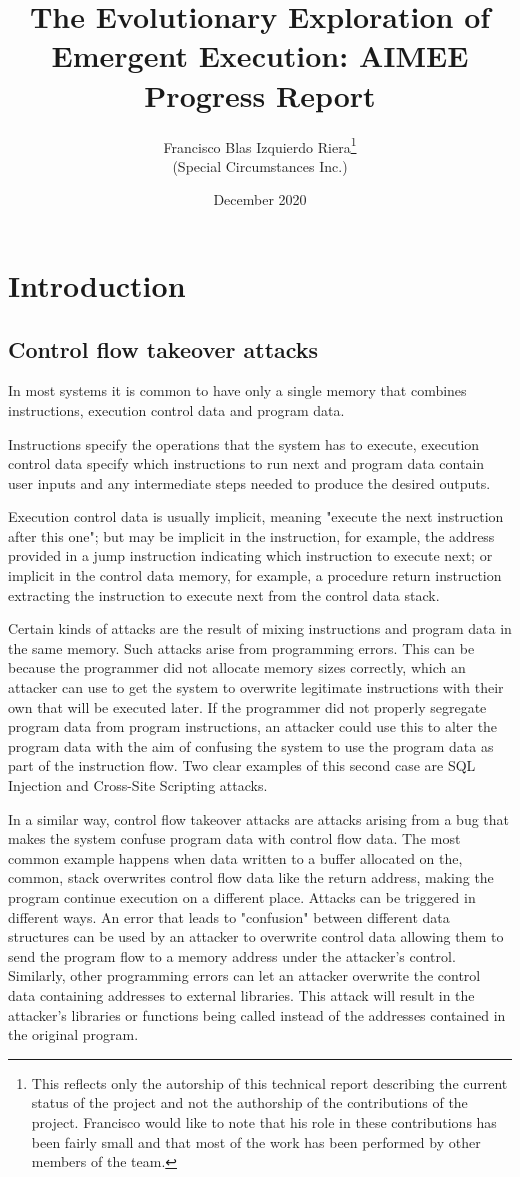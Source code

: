 \documentclass{article}
\title{The Evolutionary Exploration of Emergent Execution: AIMEE Progress Report}
\author{Francisco Blas Izquierdo Riera\footnote{This reflects only the autorship of this technical report describing the current status of the project and not the authorship of the contributions of the project. Francisco would like to note that his role in these contributions has been fairly small and that most of the work has been performed by other members of the team.} \\ (Special Circumstances Inc.)}
\date{December 2020}
\begin{document}
\maketitle

\tableofcontents

\listoffigures

\section{Introduction}

\subsection{Control flow takeover attacks}
In most systems it is common to have only a single memory that combines instructions, execution control data and program data.

Instructions specify the operations that the system has to execute, execution control data specify which instructions to run next and program data contain user inputs and any intermediate steps needed to produce the desired outputs.

Execution control data is usually implicit, meaning "execute the next instruction after this one"; but may be implicit in the instruction, for example, the address provided in a jump instruction indicating which instruction to execute next; or implicit in the control data memory, for example, a procedure return instruction extracting the instruction to execute next from the control data stack.

Certain kinds of attacks are the result of mixing instructions and program data in the same memory. Such attacks arise from programming errors. This can be because the programmer did not allocate memory sizes correctly, which an attacker can use to get the system to overwrite legitimate instructions with their own that will be executed later. If the programmer did not properly segregate program data from program instructions, an attacker could use this to alter the program data with the aim of confusing the system to use the program data as part of the instruction flow. Two clear examples of this second case are SQL Injection and Cross-Site Scripting attacks. 

In a similar way, control flow takeover attacks are attacks arising from a bug that makes the system confuse program data with control flow data. The most common example happens when data written to a buffer allocated on the, common, stack overwrites control flow data like the return address, making the program continue execution on a different place. Attacks can be triggered in different ways. An error that leads to "confusion" between different data structures can be used by an attacker to overwrite control data allowing them to send the program flow to a memory address under the attacker's control. Similarly, other programming errors can let an attacker overwrite the control data containing addresses to external libraries. This attack will result in the attacker's libraries or functions being called instead of the addresses contained in the original program.
\end{document}
